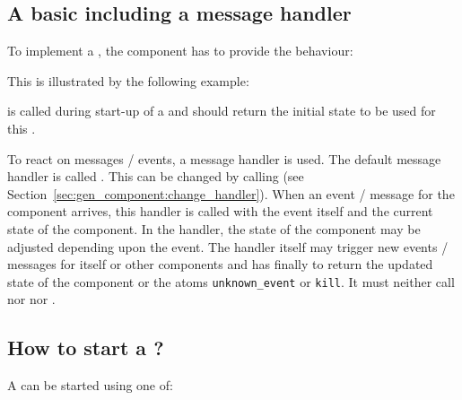 \subsection{\texorpdfstring{A basic  including a message handler}
             {A basic gen\_component including a message handler}}

To implement a , the component has to provide the
 behaviour:


This is illustrated by the following example:


 is called during start-up of a
 and should return the initial state to be used for
this .

To react on messages / events, a message handler is used. The default
message handler is called . This can be
changed by calling  (see
Section~\ref{sec:gen_component:change_handler}). When an event / message for
the component arrives, this handler is called with the event itself and the
current state of the component. In the handler, the state of the component
may be adjusted depending upon the event. The handler itself may trigger new
events / messages for itself or other components and has finally to return
the updated state of the component or the atoms \texttt{unknown\_event} or
\texttt{kill}. It must neither call  nor
 nor .

\subsection{\texorpdfstring{How to start a ?}
             {How to start a gen\_component?}}

A  can be started using one of:

